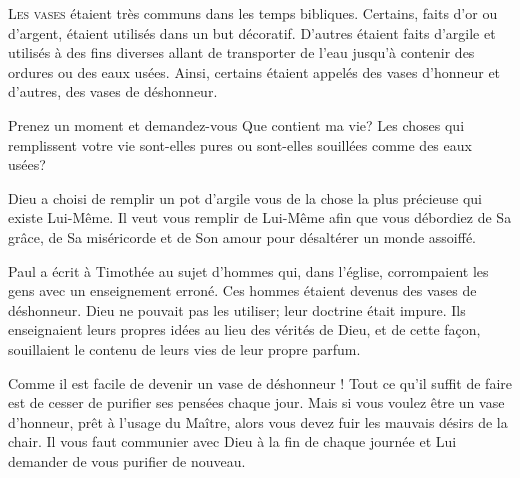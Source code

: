 



\lettrine{L}{es vases} étaient très communs dans les temps bibliques.
 Certains, faits d'or ou d'argent, étaient utilisés dans un but décoratif.
 D'autres étaient faits d'argile et utilisés à des fins diverses
 allant de transporter de l'eau jusqu'à contenir des ordures
 ou des eaux usées. Ainsi, certains étaient appelés des vases d'honneur
 et d'autres, des vases de déshonneur.

Prenez un moment et demandez-vous\frcolon{} 
 \Og Que contient ma vie? \Fg {}
 Les choses qui remplissent votre vie sont-elles
 pures ou sont-elles souillées comme des eaux usées? 


Dieu a choisi de remplir un pot d'argile \ocadr vous \fcadr{}
 de la chose la plus précieuse qui existe \ocadr Lui-Même.
 Il veut vous remplir de Lui-Même afin que vous débordiez de Sa grâce,
 de Sa miséricorde et de Son amour pour désaltérer un monde assoiffé.

Paul a écrit à Timothée au sujet d'hommes qui, dans l'église,
 corrompaient les gens avec un enseignement erroné.
 Ces hommes étaient devenus des vases de déshonneur.
 Dieu ne pouvait pas les utiliser; leur doctrine était impure.
 Ils enseignaient leurs propres idées au lieu des vérités de Dieu,
 et de cette fa\c{c}on, souillaient le contenu de leurs vies
 de leur propre parfum. 

Comme il est facile de devenir un vase de déshonneur !
 Tout ce qu'il suffit de faire est de cesser de purifier ses pensées
 chaque jour. Mais si vous voulez être un vase d'honneur,
 prêt à l'usage du Maître, alors vous devez fuir les mauvais désirs
 de la chair. Il vous faut communier avec Dieu à la fin de chaque journée
 et Lui demander de vous purifier de nouveau. 

\dvrule




